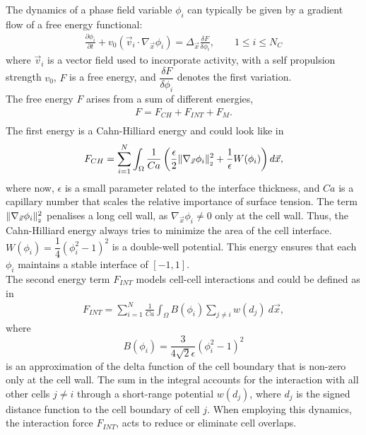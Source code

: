 The dynamics of a phase field variable $\phi_i$ can typically be given by a gradient flow of a free energy functional:
\begin{align*}
	\frac{\partial \phi_i}{\partial t} + v_0 (\vec{v}_i \cdot \nabla_{\vec{x}} \phi_i) = \Delta_{\vec{x}} \frac{\delta F}{\delta \phi_i}, \qquad 1 \leq i \leq N_C 
\end{align*}
where $\vec{v}_i$ is a vector field used to incorporate activity, with a self propulsion strength $v_0$, $F$ is a free energy, and $\dfrac{\delta F}{\delta \phi_i}$ denotes the first variation.\\
The free energy $F$ arises from a sum of different energies, 
\begin{align*}
	F = F_{CH} + F_{INT} + F_{M}. \\
\end{align*}
The first energy is a Cahn-Hilliard energy and could look like in~\cite{wenzel2021}
\begin{align*} 
	F_{CH} = \sum\limits_{i=1}^N \int_{\Omega} \dfrac{1}{Ca} \left( \dfrac{\epsilon}{2} \norm[\nabla_{\vec{x}} \phi_i]^2 + \dfrac{1}{\epsilon} W(\phi_i) \right) d\vec{x},
\end{align*}
where now, $\epsilon$ is a small parameter related to the interface thickness, and $Ca$ is a capillary number that scales the relative importance of surface tension.
The term $\norm[\nabla_{\vec{x}} \phi_i]^2$ penalises a long cell wall, as $\nabla_{\vec{x}} \phi_i \neq 0$ only at the cell wall.
Thus, the Cahn-Hilliard energy always tries to minimize the area of the cell interface. \\
$W(\phi_i) = \dfrac{1}{4} (\phi_i^2 - 1)^2$ is a double-well potential. 
This energy ensures that each $\phi_i$ maintains a stable interface of $[-1,1]$.  \\ 
The second energy term $F_{INT}$ models cell-cell interactions and could be defined as in~\cite{wenzel2021}
\begin{align*}
	F_{INT} = \sum\limits_{i=1}^N \frac{1}{Ca} \int_{\Omega} B(\phi_i) \sum\limits_{j \neq i} w(d_j) \: d\vec{x},
\end{align*}
where 
\[B(\phi_i) = \dfrac{3}{4\sqrt{2}\epsilon} (\phi_i^2 - 1)^2\]
is an approximation of the delta function of the cell boundary that is non-zero only at the cell wall.
The sum in the integral accounts for the interaction with all other cells $j \neq i$ through a short-range potential $w(d_j)$, where $d_j$ is the signed distance function to the cell boundary of cell $j$.  
When employing this dynamics, the interaction force $F_{INT}$, acts to reduce or eliminate cell overlaps. \\
